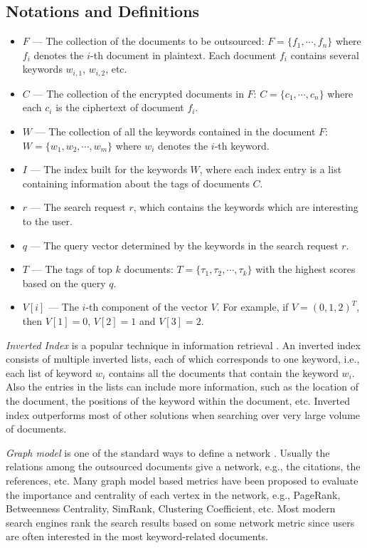 \documentclass{IEEEtran}
\begin{document}
\subsection{Notations and Definitions}
\label{sec:prelim}
\begin{itemize}
\item $F$ \---- The collection of the documents to be outsourced: $F = \{f_1, \cdots, f_n\}$ where $f_i$ denotes the $i$-th document in plaintext. Each document $f_i$ contains several keywords $w_{i,1}$, $w_{i,2}$, etc.
\item $C$ \---- The collection of the encrypted documents in $F$: $C = \{c_1, \cdots, c_n\}$ where each $c_i$ is the ciphertext of document $f_i$.
\item $W$ \---- The collection of all the keywords contained in the document $F$: $W = \{w_1, w_2, \cdots, w_m\}$ where $w_i$ denotes the $i$-th keyword.
\item $I$ \---- The index built for the keywords $W$, where each index entry is a list containing information about the tags of documents $C$.
\item $r$ \---- The search request $r$, which contains the keywords which are interesting to the user.
\item $q$ \---- The query vector determined by the keywords in the search request $r$.
\item $T$ \---- The tags of top $k$ documents: $T = \{\tau_1, \tau_2, \cdots, \tau_k\}$ with the highest scores based on the query $q$.
\item $V[i]$ \---- The $i$-th component of the vector $V$. For example, if $V = (0,1,2)^T$, then $V[1] = 0$, $V[2] = 1$ and $V[3] = 2$.
\end{itemize}

\emph{Inverted Index} is a popular technique in information retrieval \cite{TAOCPv1}. An inverted index consists of multiple inverted lists, each of which corresponds to one keyword, i.e., each list of keyword $w_i$ contains all the documents that contain the keyword $w_i$. Also the entries in the lists can include more information, such as the location of the document, the positions of the keyword within the document, etc. Inverted index outperforms most of other solutions when searching over very large volume of documents.

\emph{Graph model} is one of the standard ways to define a network \cite{NM10}. Usually the relations among the outsourced documents give a network, e.g., the citations, the references, etc. Many graph model based metrics have been proposed to evaluate the importance and centrality of each vertex in the network, e.g., PageRank, Betweenness Centrality, SimRank, Clustering Coefficient, etc. Most modern search engines rank the search results based on some network metric since users are often interested in the most keyword-related documents.
\end{document}
